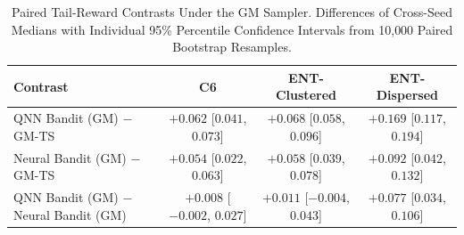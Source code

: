 \begin{table}[!t]
\centering
\caption{Paired Tail-Reward Contrasts Under the GM Sampler. Differences of Cross-Seed Medians with Individual 95\% Percentile Confidence Intervals from 10{,}000 Paired Bootstrap Resamples.}
\label{tab:contrasts}
\small
\begin{tabular}{lccc}
\hline
Contrast & C6 & ENT-Clustered & ENT-Dispersed \\
\hline
QNN Bandit (GM) $-$ GM-TS & $+0.062$ [$0.041$, $0.073$] & $+0.068$ [$0.058$, $0.096$] & $+0.169$ [$0.117$, $0.194$] \\
Neural Bandit (GM) $-$ GM-TS & $+0.054$ [$0.022$, $0.063$] & $+0.058$ [$0.039$, $0.078$] & $+0.092$ [$0.042$, $0.132$] \\
QNN Bandit (GM) $-$ Neural Bandit (GM) & $+0.008$ [$-0.002$, $0.027$] & $+0.011$ [$-0.004$, $0.043$] & $+0.077$ [$0.034$, $0.106$] \\
\hline
\end{tabular}
\end{table}

